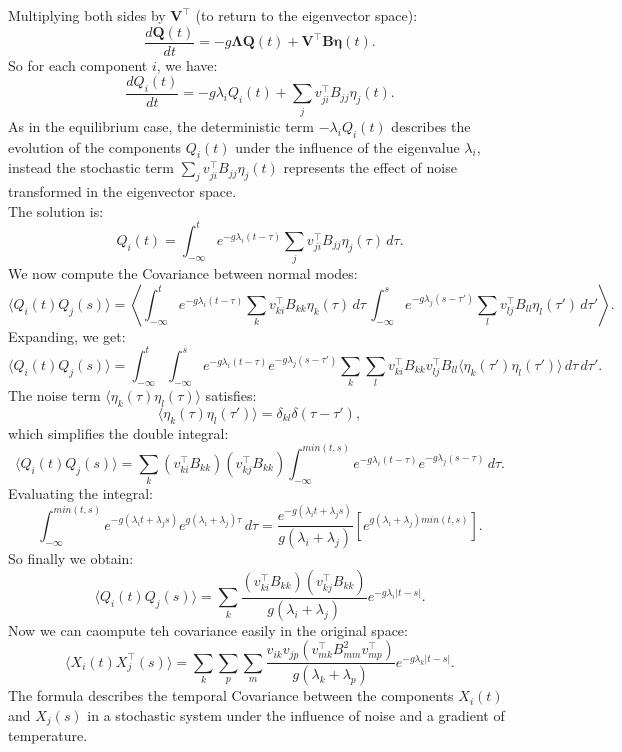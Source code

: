 \documentclass[English, Lau, oneside]{sapthesis}
\begin{document}
Multiplying both sides by \(\mathbf{V}^\top\) (to return to the eigenvector space):
\[
\frac{d\mathbf{Q}(t)}{dt} = - g \mathbf{\Lambda} \mathbf{Q}(t) + \mathbf{V}^\top \mathbf{B} \mathbf{\eta}(t).
\]
So for each component \(i\), we have:
\[
\frac{dQ_{i}(t)}{dt} = - g \lambda_i Q_{i}(t) + \sum_j v_{ji}^\top B_{jj} \eta_{j}(t).
\]
As in the equilibrium case, the deterministic term \(-\lambda_i Q_{i}(t)\) describes the evolution of the components \(Q_{i}(t)\) under the influence of the eigenvalue \(\lambda_i\), instead the stochastic term \(\sum_j v_{ji}^\top B_{jj} \eta_{j}(t)\) represents the effect of noise transformed in the eigenvector space.\\
The solution is:
\[
Q_{i}(t) = \int_{-\infty}^t e^{- g \lambda_i (t - \tau)} \sum_j v_{ji}^\top B_{jj} \eta_{j}(\tau) \, d\tau.
\]
We now compute the Covariance between normal modes:
\[
\langle Q_i(t) Q_j(s) \rangle = \left\langle \int_{-\infty}^t e^{- g \lambda_i (t - \tau)} \sum_k v_{ki}^\top B_{kk} \eta_{k}(\tau) \, d\tau \, \int_{-\infty}^s e^{- g \lambda_j (s - \tau')} \sum_l v_{lj}^\top B_{ll} \eta_{l}(\tau') \, d\tau' \right\rangle.
\]
Expanding, we get:
\[
\langle Q_i(t) Q_j(s) \rangle = \int_{-\infty}^t \int_{-\infty}^s e^{- g \lambda_i (t - \tau)} e^{- g \lambda_j (s - \tau')} \sum_k \sum_l v_{ki}^\top B_{kk} v_{lj}^\top B_{ll} \langle \eta_{k}(\tau') \eta_{l}(\tau') \rangle \, d\tau \, d\tau'.
\]
The noise term \(\langle \eta_{k}(\tau) \eta_{l}(\tau) \rangle\) satisfies:
\[
\langle \eta_{k}(\tau) \eta_{l}(\tau') \rangle = \delta_{kl} \delta(\tau - \tau'),
\]
which simplifies the double integral:
\[
\langle Q_i(t) Q_j(s) \rangle = \sum_k (v_{ki}^\top B_{kk}) (v_{kj}^\top B_{kk}) \int_{-\infty}^{min(t,s)} e^{-g \lambda_i (t - \tau)} e^{-g \lambda_j (s - \tau)} \, d\tau.
\]
Evaluating the integral:
\[
\int_{-\infty}^{min(t,s)} e^{-g(\lambda_i t + \lambda_j s)} e^{g(\lambda_i + \lambda_j) \tau} \, d\tau = \frac{e^{-g(\lambda_i t + \lambda_j s)}}{g(\lambda_i + \lambda_j)} \left[ e^{g(\lambda_i + \lambda_j) min(t,s)} \right].
\]
So finally we obtain:
\[
\langle Q_i(t) Q_j(s) \rangle = \sum_k \frac{(v_{ki}^\top B_{kk}) (v_{kj}^\top B_{kk})}{g(\lambda_i + \lambda_j)} e^{-g\lambda_i |t-s|}.
\]
Now we can caompute teh covariance easily in the original space:
\[
\langle X_i(t) X_j^\top(s) \rangle = \sum_k \sum_p \sum_m \frac{v_{ik} v_{jp} (v_{mk}^\top B_{mm}^2 v_{mp}^\top)}{g(\lambda_k + \lambda_p)} e^{-g \lambda_k |t-s|}.
\]
The formula describes the temporal Covariance between the components \( X_i(t) \) and \( X_j(s) \) in a stochastic system under the influence of noise and a gradient of temperature. \\
\end{document}
